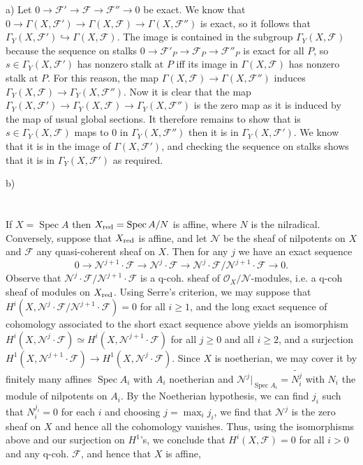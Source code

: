 \documentclass{report}
\newcommand{\F}{\mathcal{F}}
\renewcommand{\O}{\mathcal{O}}
\newcommand{\N}{\mathscr{N}}
\DeclareMathOperator{\Spec}{Spec}
\begin{document}
\bigskip
{}	a)	Let $0\rightarrow \F'\rightarrow \F\rightarrow \F''\rightarrow 0$ be exact.
We know that $0\rightarrow \Gamma(X,\F')\rightarrow \Gamma(X,\F)\rightarrow \Gamma(X,\F'')$ is exact,
so it follows that $\Gamma_Y(X,\F')\hookrightarrow \Gamma(X,\F)$.  The image is contained in the subgroup 
$\Gamma_Y(X,\F)$ because the sequence on stalks $0\rightarrow \F'_P\rightarrow \F_P\rightarrow \F''_P$
is exact for all $P$, so $s\in \Gamma_Y(X,\F')$ has nonzero stalk at $P$ iff its image in $\Gamma(X,\F)$
has nonzero stalk at $P$.  For this reason, the map $\Gamma(X,\F)\rightarrow \Gamma(X,\F'')$
induces $\Gamma_Y(X,\F)\rightarrow \Gamma_Y(X,\F'')$.
Now it is clear that the map $\Gamma_Y(X,\F')\rightarrow\Gamma_Y(X,\F)\rightarrow \Gamma_Y(X,\F'')$
is the zero map as it is induced by the map of usual global sections.  It therefore remains to show that
is $s\in \Gamma_Y(X,\F)$ maps to 0 in $\Gamma_Y(X,\F'')$ then it is in $\Gamma_Y(X,\F')$.
We know that it is in the image of $\Gamma(X,\F')$, and checking the sequence on stalks
shows that it is in $\Gamma_Y(X,\F')$ as required.

\noindent
b)	





\section{}



\bigskip
{}	If $X=\Spec A$ then $X_{\rm red}=\Spec A/N$ is affine, where $N$ is the nilradical.
Conversely, suppose that $X_{\rm red}$ is affine, and let $\N$ be the sheaf of nilpotents
on $X$ and $\F$ any quasi-coherent sheaf on $X$.		Then for any $j$ we have 
an exact sequence
$$0\rightarrow \N^{j+1}\cdot \F\rightarrow \N^j\cdot \F\rightarrow \N^{j}\cdot\F/\N^{j+1}\cdot\F\rightarrow 0.$$
Observe that $\N^{j}\cdot\F/\N^{j+1}\cdot\F$ is a q-coh. sheaf of $\O_X/\N$-modules, i.e. a q-coh sheaf of modules
on $X_{\rm red}$.	Using Serre's criterion, we may suppose that $H^i(X,\N^{j}\cdot\F/\N^{j+1}\cdot\F)=0$
for all $i\ge 1$, and the long exact sequence of cohomology associated to the short exact sequence above
yields an isomorphism
$H^{i}(X,\N^j\cdot \F)\simeq H^i(X,\N^{j+1}\cdot\F)$ for all $j\ge 0$ and all $i\ge 2$, and a surjection
$H^{1}(X,\N^{j+1}\cdot \F)\rightarrow H^1(X,\N^{j}\cdot\F)$.
Since $X$ is noetherian, we may cover it by finitely many affines $\Spec A_i$ with $A_i$ noetherian and
$\N^j\big|_{\Spec A_i}=\widetilde{N^j_i}$ with $N_i$ the module of nilpotents on $A_i$.  By the Noetherian
hypothesis, we can find $j_i$ such that $N_i^{j_i}=0$ for each $i$ and choosing $j=\max_i j_i$, we 
find that $\N^j$ is the zero sheaf on $X$ and hence all the cohomology vanishes.  Thus, using the isomorphisms
above and our surjection on $H^1$'s, we conclude that $H^i(X,\F)=0$ for all $i>0$ and any q-coh. $\F$,
and hence that $X$ is affine,
\end{document}
